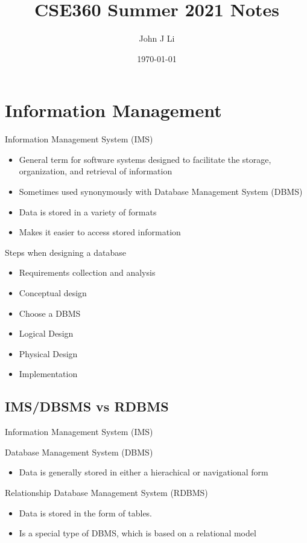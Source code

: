 \documentclass{article}
\title{CSE360 Summer 2021 Notes}
\date{\today}
\author{John J Li}
\begin{document}
    \section*{Information Management}

    Information Management System (IMS)
    \begin{itemize}
        \item General term for software systems designed to facilitate the storage, organization, and retrieval of information
        \item Sometimes used synonymously with Database Management System (DBMS)
        \item Data is stored in a variety of formats
        \item Makes it easier to access stored information
    \end{itemize}

    Steps when designing a database
    \begin{itemize}
        \item Requirements collection and analysis
        \item Conceptual design
        \item Choose a DBMS
        \item Logical Design
        \item Physical Design
        \item Implementation
    \end{itemize}

    \subsection*{IMS/DBSMS vs RDBMS}

    Information Management System (IMS)
    
    Database Management System (DBMS)
    \begin{itemize}
        \item Data is generally stored in either a hierachical or navigational form 
    \end{itemize}

    Relationship Database Management System (RDBMS)
    \begin{itemize}
        \item Data is stored in the form of tables.
        \item Is a special type of DBMS, which is based on a relational model
    \end{itemize}
\end{document}
